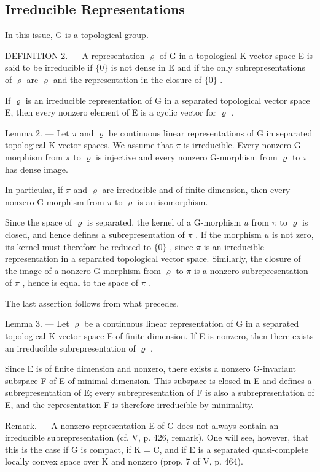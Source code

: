 \subsection{Irreducible Representations}

In this issue, G is a topological group.

DEFINITION 2. --- A representation \(\varrho\) of G in a topological K-vector space E is said to be irreducible if \(\{0\}\) is not dense in E and if the only subrepresentations of \(\varrho\) are \(\varrho\) and the representation in the closure of \(\{0\}\) .

If \(\varrho\) is an irreducible representation of G in a separated topological vector space E, then every nonzero element of E is a cyclic vector for \(\varrho\) .

Lemma 2. --- Let \(\pi\) and \(\varrho\) be continuous linear representations of G in separated topological K-vector spaces. We assume that \(\pi\) is irreducible. Every nonzero G-morphism from \(\pi\) to \(\varrho\) is injective and every nonzero G-morphism from \(\varrho\) to \(\pi\) has dense image.

In particular, if \(\pi\) and \(\varrho\) are irreducible and of finite dimension, then every nonzero G-morphism from \(\pi\) to \(\varrho\) is an isomorphism.

Since the space of \(\varrho\) is separated, the kernel of a G-morphism \(u\) from \(\pi\) to \(\varrho\) is closed, and hence defines a subrepresentation of \(\pi\) . If the morphism \(u\) is not zero, its kernel must therefore be reduced to \(\{0\}\) , since \(\pi\) is an irreducible representation in a separated topological vector space. Similarly, the closure of the image of a nonzero G-morphism from \(\varrho\) to \(\pi\) is a nonzero subrepresentation of \(\pi\) , hence is equal to the space of \(\pi\) .

The last assertion follows from what precedes.

Lemma 3. --- Let \(\varrho\) be a continuous linear representation of G in a separated topological K-vector space E of finite dimension. If E is nonzero, then there exists an irreducible subrepresentation of \(\varrho\) .

Since E is of finite dimension and nonzero, there exists a nonzero G-invariant subspace F of E of minimal dimension. This subspace is closed in E and defines a subrepresentation of E; every subrepresentation of F is also a subrepresentation of E, and the representation F is therefore irreducible by minimality.

Remark. --- A nonzero representation E of G does not always contain an irreducible subrepresentation (cf. V, p. 426, remark). One will see, however, that this is the case if G is compact, if K = C, and if E is a separated quasi-complete locally convex space over K and nonzero (prop. 7 of V, p. 464).


